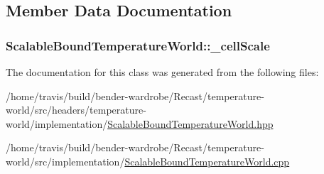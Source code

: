 \subsection{Member Data Documentation}
\hypertarget{class_scalable_bound_temperature_world_a3ad7a326006a4abbb1c7b64b4bf4d791}{
\subsubsection[{\-\_\-cell\-Scale}]{ Scalable\-Bound\-Temperature\-World\-::\-\_\-cell\-Scale\hspace{0.3cm}{\ttfamily [protected]}}}\label{class_scalable_bound_temperature_world_a3ad7a326006a4abbb1c7b64b4bf4d791}


The documentation for this class was generated from the following files\-:\begin{DoxyCompactItemize}
\item 
/home/travis/build/bender-\/wardrobe/\-Recast/temperature-\/world/src/headers/temperature-\/world/implementation/\hyperlink{_scalable_bound_temperature_world_8hpp}{Scalable\-Bound\-Temperature\-World.\-hpp}\item 
/home/travis/build/bender-\/wardrobe/\-Recast/temperature-\/world/src/implementation/\hyperlink{_scalable_bound_temperature_world_8cpp}{Scalable\-Bound\-Temperature\-World.\-cpp}\end{DoxyCompactItemize}
